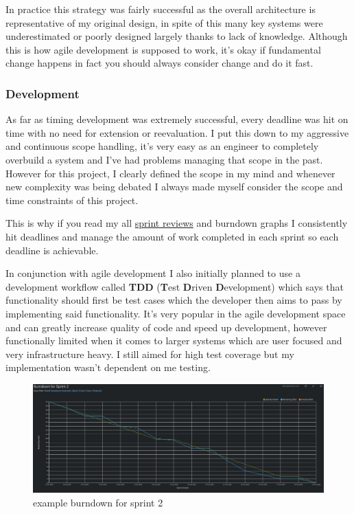 \documentclass[12pt]{article}
\begin{document}

In practice this strategy was fairly successful as the overall architecture is representative of my original design, in spite of this many key systems were underestimated or poorly designed largely thanks to lack of knowledge. Although this is how agile development is supposed to work, it's okay if fundamental change happens in fact you should always consider change and do it fast.

\subsubsection{Development}

As far as timing development was extremely successful, every deadline was hit on time with no need for extension or reevaluation. I put this down to my aggressive and continuous scope handling, it's very easy as an engineer to completely overbuild a system and I've had problems managing that scope in the past. However for this project, I clearly defined the scope in my mind and whenever new complexity was being debated I always made myself consider the scope and time constraints of this project.

This is why if you read my all \href{https://github.com/MrHarrisonBarker/CRPL/blob/main/README.md}{sprint reviews} and burndown graphs I consistently hit deadlines and manage the amount of work completed in each sprint so each deadline is achievable. 

In conjunction with agile development I also initially planned to use a development workflow called \textbf{TDD} (\textbf{T}est \textbf{D}riven \textbf{D}evelopment) which says that functionality should first be test cases which the developer then aims to pass by implementing said functionality. It's very popular in the agile development space and can greatly increase quality of code and speed up development, however functionally limited when it comes to larger systems which are user focused and very infrastructure heavy. I still aimed for high test coverage but my implementation wasn't dependent on me testing.

\begin{figure}[H]
\caption{example burndown for sprint 2}
\centering
\includegraphics[width=\textwidth,height=\textheight,keepaspectratio]{images/burndown-2}
\end{figure}
\end{document}

